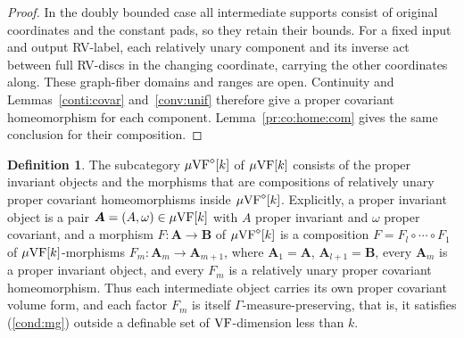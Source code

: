 \documentclass[12pt]{amsart}
\theoremstyle{plain}
\theoremstyle{definition}
\newtheorem{defn}[thm]{Definition}
\theoremstyle{remark}
\numberwithin{equation}{section}
\theoremstyle{plain}
\newcommand{\VF}{\textup{VF}}
\newcommand{\0}{\emptyset}
\newcommand{\fun}{\longrightarrow}
\newcommand{\mVF}{{\mu}{\VF}}
\begin{document}
\begin{proof}
In the doubly bounded case all intermediate supports consist of original coordinates and the constant pads, so they retain their bounds. For a fixed input and output RV-label, each relatively unary component and its inverse act between full RV-discs in the changing coordinate, carrying the other coordinates along. These graph-fiber domains and ranges are open. Continuity and Lemmas~\ref{conti:covar} and~\ref{conv:unif} therefore give a proper covariant homeomorphism for each component. Lemma~\ref{pr:co:home:com} gives the same conclusion for their composition.
\end{proof}


\begin{defn}\label{defn:diamond}
The subcategory $\mVF^{\diamond}[k]$ of $\mVF[k]$ consists of the proper invariant objects and the morphisms that are compositions of relatively unary proper covariant homeomorphisms inside $\mVF^{\diamond}[k]$. Explicitly, a proper invariant object is a pair $\bm A = (A, \omega) \in \mVF[k]$ with $A$ proper invariant and $\omega$ proper covariant, and a morphism $F : \bm A \fun \bm B$ of $\mVF^{\diamond}[k]$ is a composition $F = F_l \circ \cdots \circ F_1$ of $\mVF[k]$-morphisms $F_m : \bm A_m \fun \bm A_{m+1}$, where $\bm A_1 = \bm A$, $\bm A_{l+1} = \bm B$, every $\bm A_m$ is a proper invariant object, and every $F_m$ is a relatively unary proper covariant homeomorphism. Thus each intermediate object carries its own proper covariant volume form, and each factor $F_m$ is itself $\Gamma$-measure-preserving, that is, it satisfies (\ref{cond:mg}) outside a definable set of $\VF$-dimension less than $k$.
\end{defn}
\end{document}
